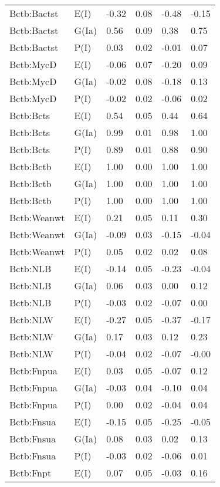 \begin{center}
\begin{longtable}{|p{1.1in}|p{0.7in}|p{0.7in}|p{0.6in}|p{0.6in}|p{0.6in}|}
  Bctb:Bactst & E(I) & -0.32 & 0.08 & -0.48 & -0.15 \\ 
  Bctb:Bactst & G(Ia) & 0.56 & 0.09 & 0.38 & 0.75 \\ 
  Bctb:Bactst & P(I) & 0.03 & 0.02 & -0.01 & 0.07 \\ 
  Bctb:MycD & E(I) & -0.06 & 0.07 & -0.20 & 0.09 \\ 
  Bctb:MycD & G(Ia) & -0.02 & 0.08 & -0.18 & 0.13 \\ 
  Bctb:MycD & P(I) & -0.02 & 0.02 & -0.06 & 0.02 \\ 
  Bctb:Bcts & E(I) & 0.54 & 0.05 & 0.44 & 0.64 \\ 
  Bctb:Bcts & G(Ia) & 0.99 & 0.01 & 0.98 & 1.00 \\ 
  Bctb:Bcts & P(I) & 0.89 & 0.01 & 0.88 & 0.90 \\ 
  Bctb:Bctb & E(I) & 1.00 & 0.00 & 1.00 & 1.00 \\ 
  Bctb:Bctb & G(Ia) & 1.00 & 0.00 & 1.00 & 1.00 \\ 
  Bctb:Bctb & P(I) & 1.00 & 0.00 & 1.00 & 1.00 \\ 
  Bctb:Weanwt & E(I) & 0.21 & 0.05 & 0.11 & 0.30 \\ 
  Bctb:Weanwt & G(Ia) & -0.09 & 0.03 & -0.15 & -0.04 \\ 
  Bctb:Weanwt & P(I) & 0.05 & 0.02 & 0.02 & 0.08 \\ 
  Bctb:NLB & E(I) & -0.14 & 0.05 & -0.23 & -0.04 \\ 
  Bctb:NLB & G(Ia) & 0.06 & 0.03 & 0.00 & 0.12 \\ 
  Bctb:NLB & P(I) & -0.03 & 0.02 & -0.07 & 0.00 \\ 
  Bctb:NLW & E(I) & -0.27 & 0.05 & -0.37 & -0.17 \\ 
  Bctb:NLW & G(Ia) & 0.17 & 0.03 & 0.12 & 0.23 \\ 
  Bctb:NLW & P(I) & -0.04 & 0.02 & -0.07 & -0.00 \\ 
  Bctb:Fnpua & E(I) & 0.03 & 0.05 & -0.07 & 0.12 \\ 
  Bctb:Fnpua & G(Ia) & -0.03 & 0.04 & -0.10 & 0.04 \\ 
  Bctb:Fnpua & P(I) & 0.00 & 0.02 & -0.04 & 0.04 \\ 
  Bctb:Fnsua & E(I) & -0.15 & 0.05 & -0.25 & -0.05 \\ 
  Bctb:Fnsua & G(Ia) & 0.08 & 0.03 & 0.02 & 0.13 \\ 
  Bctb:Fnsua & P(I) & -0.03 & 0.02 & -0.06 & 0.01 \\ 
  Bctb:Fnpt & E(I) & 0.07 & 0.05 & -0.03 & 0.16 \\ 

\end{longtable}
\end{center}

